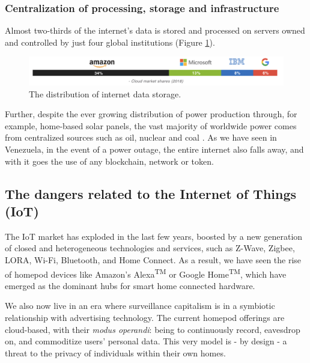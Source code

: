 \subsubsection{Centralization of processing, storage and infrastructure}
\label{sec:introdata}
Almost two-thirds of the internet's data is stored and processed on servers owned and controlled by just four global institutions (Figure \ref{fig:internetDist}). 

\begin{figure}[h]
	\includegraphics[width=\linewidth, trim= 0cm 0cm 0cm 0cm, clip]{Whitepaper/Figures/internetDist.png}
	\caption{The distribution of internet data storage.}
	\label{fig:internetDist}
\end{figure}
Further, despite the ever growing distribution of power production through, for example, home-based solar panels, the vast majority of worldwide power comes from centralized sources such as oil, nuclear and coal \cite{Statista2019}. As we have seen in Venezuela, in the event of a power outage, the entire internet also falls away, and with it goes the use of any blockchain, network or token.

\subsection{The dangers related to the Internet of Things (IoT)}
\label{sec:introiot}
The IoT market has exploded in the last few years, boosted by a new generation of closed and heterogeneous technologies and services, such as Z-Wave, Zigbee, LORA, Wi-Fi, Bluetooth, and Home Connect. As a result, we have seen the rise of homepod devices like Amazon's Alexa\textsuperscript{TM} or Google Home\textsuperscript{TM}, which have emerged as the dominant hubs for smart home connected hardware. 

We also now live in an era where surveillance capitalism is in a symbiotic relationship with advertising technology. The current homepod offerings are cloud-based, with their \textit{modus operandi}: being to continuously record, eavesdrop on, and commoditize users' personal data. This very model is - by design - a threat to the privacy of individuals within their own homes. 


